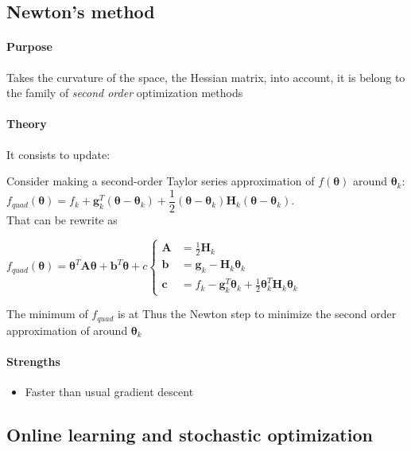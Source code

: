 \subsection{Newton's method}
\paragraph{Purpose}
Takes the curvature of the space, the Hessian matrix, into account, it is belong to the family of
\emph{second order} optimization methods
\paragraph{Theory}
It consists to update:
\begin{center}
\end{center}
Consider making a second-order Taylor series approximation of $f(\bm{\theta})$ around $\bm{\theta}_{
k}$: 
$f_{quad}(\bm{\theta}) = f_{k} + \bm{g}^{T}_{k}(\bm{\theta} -\bm{\theta}_{k}) + \dfrac{1}{2}(\bm{
\theta} -\bm{\theta}_{k})\bm{H}_{k}(\bm{\theta} -\bm{\theta}_{k})$.\\
That can be rewrite as
\begin{center}
    $f_{quad}(\bm{\theta}) = \bm{\theta}^{T}\bm{A}\bm{\theta} + \bm{b}^{T}\bm{\theta} + c
    \begin{cases}
        \bm{A} &= \frac{1}{2}\bm{H}_{k}\\
        \bm{b} &= \bm{g}_{k} - \bm{H}_{k}\bm{\theta}_{k}\\
        \bm{c} &= f_{k} - \bm{g}^{T}_{k}\bm{\theta}_{k} + \frac{1}{2}\bm{\theta}_{k}^{T}\bm{H}_{k}
        \bm{\theta}_{k}
    \end{cases}$
\end{center}
The minimum of $f_{quad}$ is at 
Thus the Newton step  to minimize the second order approximation of around $\bm{\theta}_{k}$
\paragraph{Strengths}
\begin{itemize}
    \item Faster than usual gradient descent
\end{itemize}


\subsection{Online learning and stochastic optimization}

